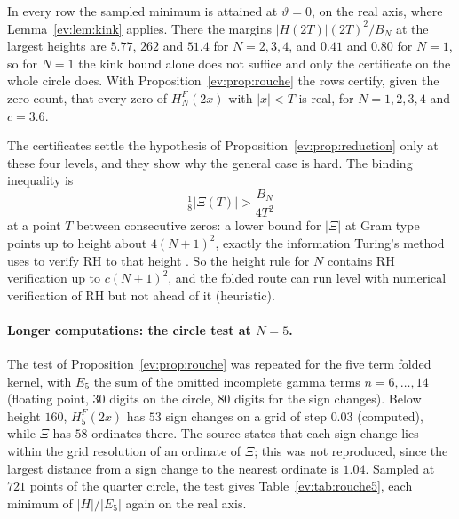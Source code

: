 In every row the sampled minimum is attained at $\vartheta=0$, on the real axis, where Lemma~\ref{ev:lem:kink} applies. There the margins $|H(2T)|(2T)^2/B_N$ at the largest heights are $5.77$, $262$ and $51.4$ for $N=2,3,4$, and $0.41$ and $0.80$ for $N=1$, so for $N=1$ the kink bound alone does not suffice and only the certificate on the whole circle does. With Proposition~\ref{ev:prop:rouche} the rows certify, given the zero count, that every zero of $H^F_N(2x)$ with $|x|<T$ is real, for $N=1,2,3,4$ and $c=3.6$.

The certificates settle the hypothesis of Proposition~\ref{ev:prop:reduction} only at these four levels, and they show why the general case is hard. The binding inequality is
\[
\tfrac18|\Xi(T)|>\frac{B_N}{4T^2}
\]
at a point $T$ between consecutive zeros: a lower bound for $|\Xi|$ at Gram type points up to height about $4(N+1)^2$, exactly the information Turing's method uses to verify RH to that height \cite{Turing53}. So the height rule for $N$ contains RH verification up to $c(N+1)^2$, and the folded route can run level with numerical verification of RH but not ahead of it (heuristic).

\paragraph{Longer computations: the circle test at $N=5$.} The test of Proposition~\ref{ev:prop:rouche} was repeated for the five term folded kernel, with $E_5$ the sum of the omitted incomplete gamma terms $n=6,\ldots,14$ (floating point, $30$ digits on the circle, $80$ digits for the sign changes). Below height $160$, $H^F_5(2x)$ has $53$ sign changes on a grid of step $0.03$ (computed), while $\Xi$ has $58$ ordinates there. The source states that each sign change lies within the grid resolution of an ordinate of $\Xi$; this was not reproduced, since the largest distance from a sign change to the nearest ordinate is $1.04$. Sampled at $721$ points of the quarter circle, the test gives Table~\ref{ev:tab:rouche5}, each minimum of $|H|/|E_5|$ again on the real axis.

